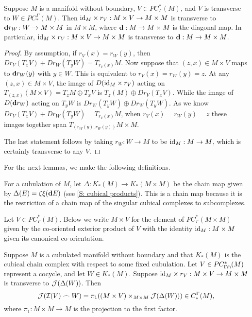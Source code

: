 \begin{lemma}\label{L: M times transverse diag}
Suppose $M$ is a manifold without boundary, $V\in PC^*_{\Gamma}(M)$, and $V$ is transverse to $W\in PC_*^\Gamma(M)$. Then $\mathrm{id}_M\times r_V:M\times V\to M\times M$ is transverse to $\mathbf{d} r_W \colon W \to M\times M$ in $M\times M$, where $\mathbf{d}:M\to M\times M$ is the diagonal map. In particular, $\mathrm{id}_M\times r_V:M\times V\to M\times M$ is transverse to $\mathbf{d}:M\to M\times M$.
\end{lemma}
\begin{proof}
By assumption, if $r_V(x)=r_W(y)$, then $Dr_V(T_xV)+Dr_W(T_yW)=T_{r_V(x)}M$. Now suppose that $(z,x)\in M\times V$ maps to $\mathbf{d} r_W(y)$ with $y\in W$. This is equivalent to $r_V(x)=r_W(y)=z$. At any $(z,x)\in M\times V$, the image of $D(\mathrm{id}_M\times r_V)$ acting on $T_{(z,x)}(M\times V)=T_zM\oplus T_xV$ is $T_z(M)\oplus Dr_V(T_xV)$. While the image of $D(\mathbf{d} r_W)$ acting on $T_yW$ is $Dr_W(T_yW)\oplus Dr_W(T_yW)$. As we know $Dr_V(T_xV)+Dr_W(T_yW)=T_{r_V(x)}M$, when $r_V(x)=r_W(y)=z$ these images together span $T_{(r_W(y),r_W(y))}M\times M$.

The last statement follows by taking $r_W \colon W \to M$ to be $\mathrm{id}_M:M\to M$, which is certainly transverse to any $V$.
\end{proof}

For the next lemmas, we make the following definitions.

\begin{definition}
For a cubulation of $M$, let $\Delta:K_*(M)\to K_*(M\times M)$ be the chain map given by $\Delta(E)=\zeta\xi(\mathbf{d} E)$ (see \cref{S: cubical products}). This is a chain map because it is the restriction of a chain map of the singular cubical complexes to subcomplexes.
\end{definition}

\begin{definition}
Let $V\in PC^*_\Gamma(M)$. Below we write $M\times V$ for the element of $PC^*_\Gamma(M\times M)$ given by the co-oriented exterior product of $V$ with the identity $\mathrm{id}_M:M\times M$ given its canonical co-orientation.
\end{definition}


\begin{lemma}\label{L: image of cubical cap}
Suppose $M$ is a cubulated manifold without boundary and that $K_*(M)$ is the cubical chain complex with respect to some fixed cubulation. Let $V\in PC^*_{\Gamma\pitchfork}(M)$ represent a cocycle, and let $W\in K_*(M)$. Suppose $\mathrm{id}_M\times r_V:M\times V\to M\times M$ is transverse to $\mathcal{J}(\Delta(W))$. Then $$\mathcal{J}(\mathcal{I}(V)\frown W)=\pi_1( (M\times V)\times_{M\times M}\mathcal{J}(\Delta(W)))\in C_*^\Gamma(M),$$
where $\pi_1:M\times M\to M$ is the projection to the first factor.
\end{lemma}

